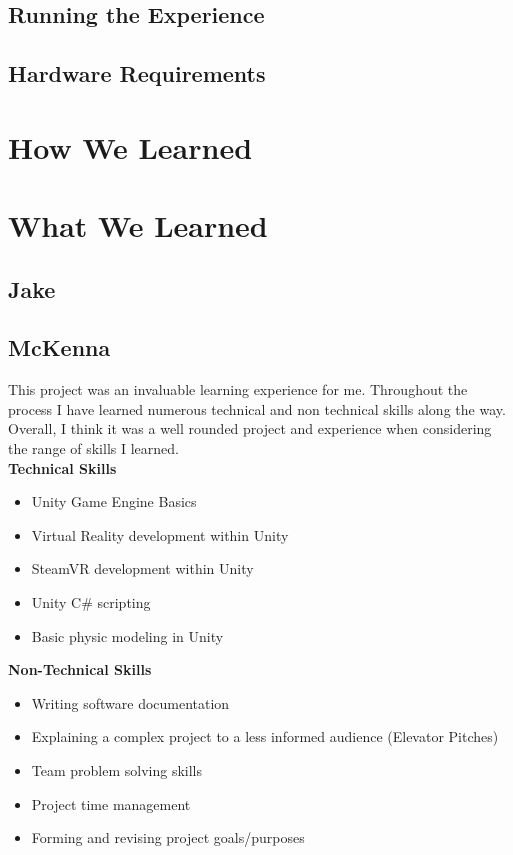 \documentclass[10pt,journal,compsoc,onecolumn, draftclsnofoot]{IEEEtran}
\begin{document}
\subsection{Running the Experience}
\subsection{Hardware Requirements}

\section{How We Learned}

\section{What We Learned}
\subsection{Jake}

\subsection{McKenna}
This project was an invaluable learning experience for me. Throughout the process I have learned numerous technical and non technical skills along the way. Overall, I think it was a well rounded project and experience when considering the range of skills I learned. \\

\textbf{Technical Skills}
\begin{itemize}
	\item Unity Game Engine Basics
	\item Virtual Reality development within Unity
	\item SteamVR development within Unity
	\item Unity C\# scripting
	\item Basic physic modeling in Unity
\end{itemize}

\textbf{Non-Technical Skills}
\begin{itemize}
	\item Writing software documentation
	\item Explaining a complex project to a less informed audience (Elevator Pitches)
	\item Team problem solving skills
	\item Project time management
	\item Forming and revising project goals/purposes \\
\end{itemize}
\end{document}
